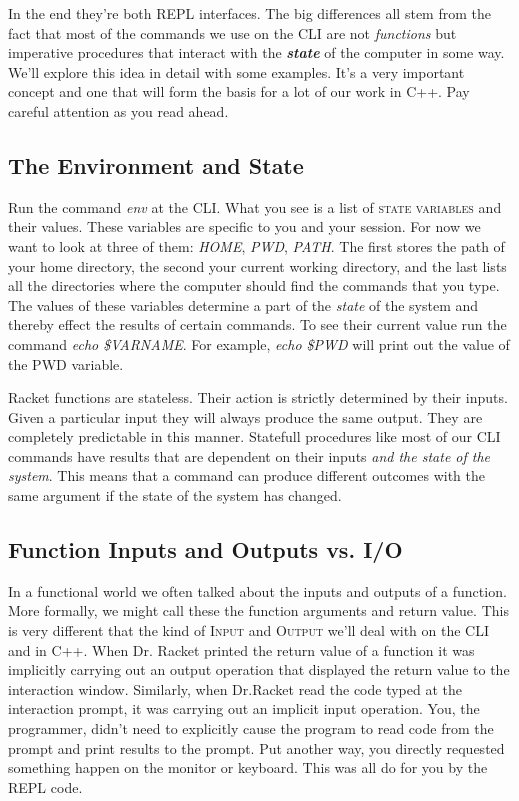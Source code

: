 \documentclass[]{tufte-handout}
\begin{document}
In the end they're both REPL interfaces.  The big differences all stem from the fact that most of the commands we use on the CLI are not \textit{functions} but imperative procedures that interact with the \textit{\textbf{state}} of the computer in some way. We'll explore this idea in detail with some examples. It's a very important concept and one that will form the basis for a lot of our work in C++. Pay careful attention as you read ahead. 

\subsection{The Environment and State}

Run the command \textit{env} at the CLI.  What you see is a list of \textsc{state variables} and their values. These variables are specific to you and your session. For now we want to look at three of them: \textit{HOME}, \textit{PWD}, \textit{PATH}. The first stores the path of your home directory, the second your current working directory, and the last lists all the directories where the computer should find the commands that you type. The values of these variables determine a part of the \textit{state} of the system and thereby effect the results of certain commands. To see their current value run the command \textit{echo \$VARNAME}. For example, \textit{echo \$PWD} will print out the value of the PWD variable. 

Racket functions are stateless. Their action is strictly determined by their inputs. Given a particular input they will always produce the same output. They are completely predictable in this manner. Statefull procedures like most of our CLI commands have results that are dependent on their inputs \textit{and the state of the system}. This means that a command can produce different outcomes with the same argument if the state of the system has changed. 

\subsection{Function Inputs and Outputs vs. I/O}

In a functional world we often talked about the inputs and outputs of a function. More formally, we might call these the function arguments and return value. This is very different that the kind of \textsc{Input} and \textsc{Output} we'll deal with on the CLI and in C++.  When Dr. Racket printed the return value of a function it was implicitly carrying out an output operation that displayed the return value to the interaction window. Similarly, when Dr.Racket read the code typed at the interaction prompt, it was carrying out an implicit input operation.  You, the programmer, didn't need to explicitly cause the program to read code from the prompt and print results to the prompt. Put another way, you directly requested something happen on the monitor or keyboard. This was all do for you by the REPL code. 
\end{document}
